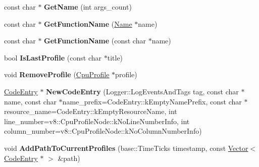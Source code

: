 \begin{DoxyCompactItemize}
\item 
\hypertarget{classv8_1_1internal_1_1_cpu_profiles_collection_a1e6314d9d094fef12d5dfaf8342636a9}{}const char $\ast$ {\bfseries Get\+Name} (int args\+\_\+count)\label{classv8_1_1internal_1_1_cpu_profiles_collection_a1e6314d9d094fef12d5dfaf8342636a9}

\item 
\hypertarget{classv8_1_1internal_1_1_cpu_profiles_collection_a42312f9ef00d25758325a14afe1d695a}{}const char $\ast$ {\bfseries Get\+Function\+Name} (\hyperlink{classv8_1_1internal_1_1_name}{Name} $\ast$name)\label{classv8_1_1internal_1_1_cpu_profiles_collection_a42312f9ef00d25758325a14afe1d695a}

\item 
\hypertarget{classv8_1_1internal_1_1_cpu_profiles_collection_aeb63cb9ff59e5585d9c0c82396c6f82d}{}const char $\ast$ {\bfseries Get\+Function\+Name} (const char $\ast$name)\label{classv8_1_1internal_1_1_cpu_profiles_collection_aeb63cb9ff59e5585d9c0c82396c6f82d}

\item 
\hypertarget{classv8_1_1internal_1_1_cpu_profiles_collection_ac5981b296e5fdb7fb06c22dab3548d64}{}bool {\bfseries Is\+Last\+Profile} (const char $\ast$title)\label{classv8_1_1internal_1_1_cpu_profiles_collection_ac5981b296e5fdb7fb06c22dab3548d64}

\item 
\hypertarget{classv8_1_1internal_1_1_cpu_profiles_collection_a4c4bf98364eb1a14e61667f1893faeb4}{}void {\bfseries Remove\+Profile} (\hyperlink{classv8_1_1internal_1_1_cpu_profile}{Cpu\+Profile} $\ast$profile)\label{classv8_1_1internal_1_1_cpu_profiles_collection_a4c4bf98364eb1a14e61667f1893faeb4}

\item 
\hypertarget{classv8_1_1internal_1_1_cpu_profiles_collection_a20e8b2a7d9040a3f2c7a46863c2aecea}{}\hyperlink{classv8_1_1internal_1_1_code_entry}{Code\+Entry} $\ast$ {\bfseries New\+Code\+Entry} (Logger\+::\+Log\+Events\+And\+Tags tag, const char $\ast$name, const char $\ast$name\+\_\+prefix=Code\+Entry\+::k\+Empty\+Name\+Prefix, const char $\ast$resource\+\_\+name=Code\+Entry\+::k\+Empty\+Resource\+Name, int line\+\_\+number=v8\+::\+Cpu\+Profile\+Node\+::k\+No\+Line\+Number\+Info, int column\+\_\+number=v8\+::\+Cpu\+Profile\+Node\+::k\+No\+Column\+Number\+Info)\label{classv8_1_1internal_1_1_cpu_profiles_collection_a20e8b2a7d9040a3f2c7a46863c2aecea}

\item 
\hypertarget{classv8_1_1internal_1_1_cpu_profiles_collection_a3fc09548045fa69ba6f4b0737efa1680}{}void {\bfseries Add\+Path\+To\+Current\+Profiles} (base\+::\+Time\+Ticks timestamp, const \hyperlink{classv8_1_1internal_1_1_vector}{Vector}$<$ \hyperlink{classv8_1_1internal_1_1_code_entry}{Code\+Entry} $\ast$ $>$ \&path)\label{classv8_1_1internal_1_1_cpu_profiles_collection_a3fc09548045fa69ba6f4b0737efa1680}

\end{DoxyCompactItemize}
